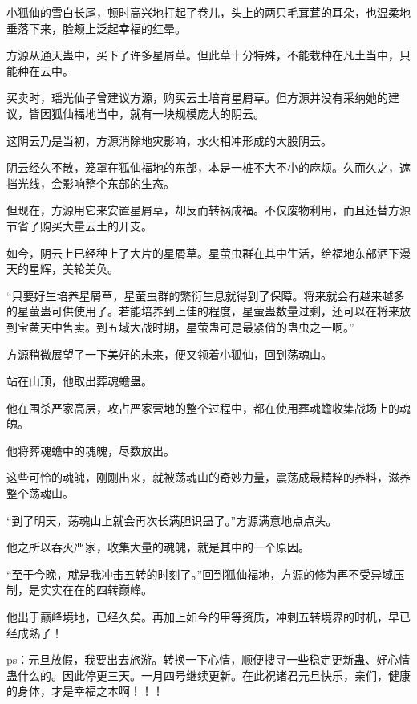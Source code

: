 \begin{this_body}
小狐仙的雪白长尾，顿时高兴地打起了卷儿，头上的两只毛茸茸的耳朵，也温柔地垂落下来，脸颊上泛起幸福的红晕。

方源从通天蛊中，买下了许多星屑草。但此草十分特殊，不能栽种在凡土当中，只能种在云中。

买卖时，瑶光仙子曾建议方源，购买云土培育星屑草。但方源并没有采纳她的建议，皆因狐仙福地当中，就有一块规模庞大的阴云。

这阴云乃是当初，方源消除地灾影响，水火相冲形成的大股阴云。

阴云经久不散，笼罩在狐仙福地的东部，本是一桩不大不小的麻烦。久而久之，遮挡光线，会影响整个东部的生态。

但现在，方源用它来安置星屑草，却反而转祸成福。不仅废物利用，而且还替方源节省了购买大量云土的开支。

如今，阴云上已经种上了大片的星屑草。星萤虫群在其中生活，给福地东部洒下漫天的星辉，美轮美奂。

“只要好生培养星屑草，星萤虫群的繁衍生息就得到了保障。将来就会有越来越多的星萤蛊可供使用了。若能培养到上佳的程度，星萤蛊数量过剩，还可以在将来放到宝黄天中售卖。到五域大战时期，星萤蛊可是最紧俏的蛊虫之一啊。”

方源稍微展望了一下美好的未来，便又领着小狐仙，回到荡魂山。

站在山顶，他取出葬魂蟾蛊。

他在围杀严家高层，攻占严家营地的整个过程中，都在使用葬魂蟾收集战场上的魂魄。

他将葬魂蟾中的魂魄，尽数放出。

这些可怜的魂魄，刚刚出来，就被荡魂山的奇妙力量，震荡成最精粹的养料，滋养整个荡魂山。

“到了明天，荡魂山上就会再次长满胆识蛊了。”方源满意地点点头。

他之所以吞灭严家，收集大量的魂魄，就是其中的一个原因。

“至于今晚，就是我冲击五转的时刻了。”回到狐仙福地，方源的修为再不受异域压制，是实实在在的四转巅峰。

他出于巅峰境地，已经久矣。再加上如今的甲等资质，冲刺五转境界的时机，早已经成熟了！

ps：元旦放假，我要出去旅游。转换一下心情，顺便搜寻一些稳定更新蛊、好心情蛊什么的。因此停更三天。一月四号继续更新。在此祝诸君元旦快乐，亲们，健康的身体，才是幸福之本啊！！！

\end{this_body}

